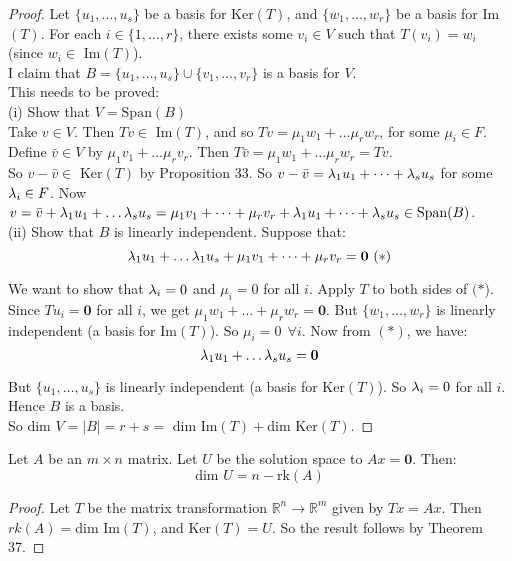 \begin{proof}
Let $\{u_1,\dots,u_s\}$ be a basis for Ker$(T)$, and $\{w_1,\dots,w_r\}$ be a basis for Im$(T)$. For each $i \in \{1,\dots,r\}$, there exists some $v_i \in V$ such that $T(v_i) = w_i$ (since $w_i \in $ Im$(T)$).\\

I claim that $B = \{u_1,\dots,u_s\} \cup \{v_1,\dots,v_r\}$ is a basis for $V$.\\
This needs to be proved:\\

(i) Show that $V = \text{Span}(B)$\\

Take $v \in V$. Then $Tv \in $ Im$(T)$, and so $Tv = \mu_1w_1 + \dots \mu_rw_r$, for some $\mu_i \in F$. Define $\bar{v} \in V$ by $\mu_1v_1 + \dots \mu_rv_r$. Then $T\bar{v} = \mu_1w_1 + \dots \mu_rw_r = Tv$.\\ So $v - \bar{v} \in $ Ker$(T)$ by Proposition 33. So $v - \bar{v} = \lambda_1u_1 + \dots + \lambda_su_s$ for some $\lambda_i \in F$. Now $v = \bar{v} + \lambda_1u_1 + \dots \lambda_su_s = \mu_1v_1 + \dots + \mu_rv_r + \lambda_1u_1 + \dots + \lambda_su_s \in \text{Span}(B)$.\\

(ii) Show that $B$ is linearly independent. Suppose that:
 \[\lambda_1u_1 + \dots \lambda_1u_s + \mu_1v_1 + \dots + \mu_rv_r = \mathbf{0} ~(*)\]
 
 We want to show that $\lambda_i = 0$ and $\mu_i = 0$ for all $i$. Apply $T$ to both sides of $(*$). Since $Tu_i = \mathbf{0}$ for all $i$, we get $\mu_1w_1 + \dots + \mu_rw_r = \mathbf{0}$. But $\{w_1,\dots,w_r\}$ is linearly independent (a basis for Im$(T)$). So $\mu_i = 0~~ \forall i$. Now from $(*)$, we have:
\[\lambda_1u_1 + \dots \lambda_su_s = \mathbf{0}\]

But $\{u_1,\dots,u_s\}$ is linearly independent (a basis for Ker$(T)$). So $\lambda_i = 0$ for all $i$. Hence $B$ is a basis.\\

 So dim $V = |B| = r + s = $ dim Im$(T) + $dim Ker$(T)$.
\end{proof}\vspace*{10pt}


\begin{corollary} Let $A$ be an $m\times n$ matrix. Let $U$ be the solution space to $Ax = \mathbf{0}$. Then:
\[\text{dim }U = n - \text{rk}(A)\]
\end{corollary}


\begin{proof}
Let $T$ be the matrix transformation $\mathbb{R}^n \to \mathbb{R}^m$ given by $Tx = Ax$. Then $rk(A) = $dim Im$(T)$, and Ker$(T) = U$. So the result follows by Theorem 37.
\end{proof}

